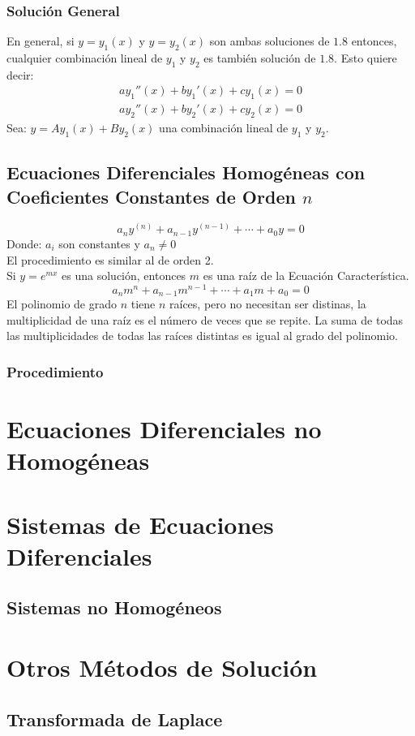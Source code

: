 \subsection{Solución General}
En general, si $y=y_1(x)$ y $y=y_2(x)$ son ambas soluciones de $1\texttt{.}8$ entonces, cualquier combinación lineal de $y_1$ y $y_2$ es también solución de $1\texttt{.}8$. Esto quiere decir:
\begin{align*}
 ay_1''(x)+by_1'(x) +cy_1(x)=0 \\
ay_2''(x)+by_2'(x) +cy_2(x)=0
\end{align*}
Sea: $y=Ay_1(x)+By_2(x)$ una combinación lineal de $y_1$ y $y_2$.
\section{Ecuaciones Diferenciales Homogéneas con Coeficientes Constantes de Orden $n$}
$$a_ny^{(n)}+a_{n-1}y^{(n-1)}+\cdots + a_0 y = 0$$
Donde: $a_i$ son constantes y $a_n\neq 0$ \\${ }$\\
El procedimiento es similar al de orden 2. \\${ }$\\
Si $y=e^{mx}$ es una solución, entonces $m$ es una raíz de la Ecuación Característica.
$$\boxed{a_nm^n+a_{n-1}m^{n-1}+\cdots +a_1 m + a_0 = 0}$$
El polinomio de grado $n$ tiene $n$ raíces, pero no necesitan ser distinas, la multiplicidad de una raíz es el número de veces que se repite. La suma de todas las multiplicidades de todas las raíces distintas es igual al grado del polinomio.
\subsection{Procedimiento}
\chapter{Ecuaciones Diferenciales no Homogéneas}
\chapter{Sistemas de Ecuaciones Diferenciales}
\section{Sistemas no Homogéneos}
\chapter{Otros Métodos de Solución}
\section{Transformada de Laplace}